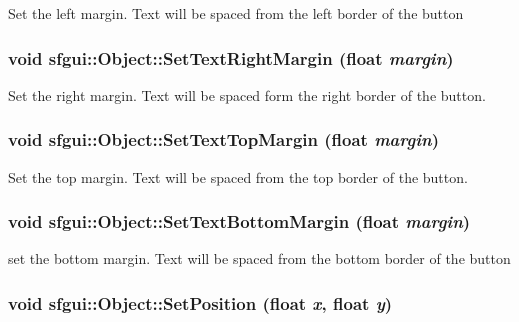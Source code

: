 Set the left margin. Text will be spaced from the left border of the button \hypertarget{classsfgui_1_1Object_dcea61673771a680fc47e4b838c2a59e}{
\subsubsection[SetTextRightMargin]{\setlength{\rightskip}{0pt plus 5cm}void sfgui::Object::SetTextRightMargin (float {\em margin})}}
\label{classsfgui_1_1Object_dcea61673771a680fc47e4b838c2a59e}




Set the right margin. Text will be spaced form the right border of the button. \hypertarget{classsfgui_1_1Object_6c3eb411a957d05707d858ded4cd951c}{
\subsubsection[SetTextTopMargin]{\setlength{\rightskip}{0pt plus 5cm}void sfgui::Object::SetTextTopMargin (float {\em margin})}}
\label{classsfgui_1_1Object_6c3eb411a957d05707d858ded4cd951c}




Set the top margin. Text will be spaced from the top border of the button. \hypertarget{classsfgui_1_1Object_db61eb19249fbbd28462cc79ca17b738}{
\subsubsection[SetTextBottomMargin]{\setlength{\rightskip}{0pt plus 5cm}void sfgui::Object::SetTextBottomMargin (float {\em margin})}}
\label{classsfgui_1_1Object_db61eb19249fbbd28462cc79ca17b738}




set the bottom margin. Text will be spaced from the bottom border of the button \hypertarget{classsfgui_1_1Object_664c57bd35504a7d00963980d68dd022}{
\subsubsection[SetPosition]{\setlength{\rightskip}{0pt plus 5cm}void sfgui::Object::SetPosition (float {\em x}, \/  float {\em y})}}
\label{classsfgui_1_1Object_664c57bd35504a7d00963980d68dd022}




